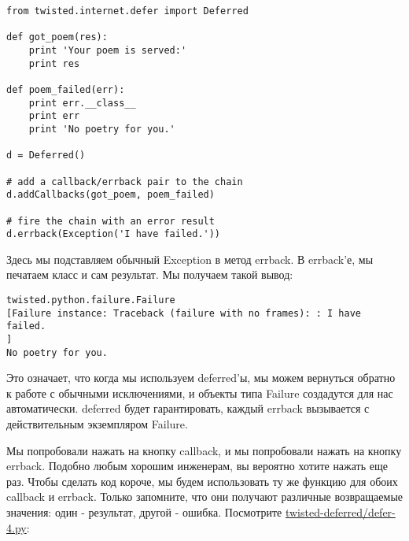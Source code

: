  \begin{verbatim}
from twisted.internet.defer import Deferred

def got_poem(res):
    print 'Your poem is served:'
    print res

def poem_failed(err):
    print err.__class__
    print err
    print 'No poetry for you.'

d = Deferred()

# add a callback/errback pair to the chain
d.addCallbacks(got_poem, poem_failed)

# fire the chain with an error result
d.errback(Exception('I have failed.'))
\end{verbatim} 


Здесь мы подставляем обычный Exception в метод errback. 
В errback'е, мы печатаем класс и сам результат. Мы получаем такой вывод:

 \begin{verbatim}
twisted.python.failure.Failure
[Failure instance: Traceback (failure with no frames): : I have failed.
]
No poetry for you.
\end{verbatim} 


Это означает, что когда мы используем deferred'ы, мы можем 
вернуться обратно к работе с обычными исключениями, и объекты 
типа Failure создадутся для нас автоматически. deferred будет 
гарантировать, каждый errback вызывается с действительным 
экземпляром Failure.


Мы попробовали нажать на кнопку callback, и 
мы попробовали нажать на кнопку errback. Подобно любым 
хорошим инженерам, вы вероятно хотите нажать еще раз. 
Чтобы сделать код короче, мы будем использовать ту же 
функцию для обоих callback и errback. Только запомните, что 
они получают различные возвращаемые значения: один - результат, 
другой - ошибка. Посмотрите 
\href{http://github.com/jdavisp3/twisted-intro/blob/master/twisted-deferred/defer-4.py}{twisted-deferred/defer-4.py}:

